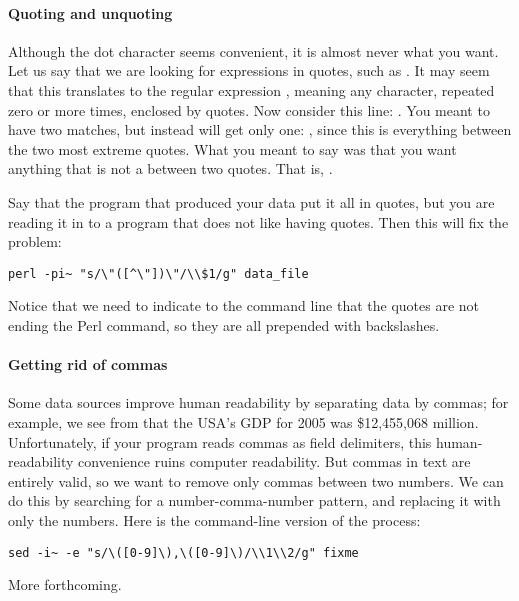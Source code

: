 \paragraph{Quoting and unquoting}
Although the dot character seems convenient, it is almost never what you
want. Let us say that we are looking for expressions in quotes,
such as . It may seem that this translates to the regular
expression , meaning any character, repeated zero or more
times, enclosed by quotes. Now consider this line: . You meant to have two matches, but instead will get only
one: , since this is everything between the
two most extreme quotes. What you meant to say was that you want anything
that is not a  between two quotes. That is, . 

Say that the program that produced your data put it all in
quotes, but you are reading it in to a  program that does not like
having quotes. Then this will fix the problem:
\begin{lstlisting}
perl -pi~ "s/\"([^\"])\"/\\$1/g" data_file
\end{lstlisting}
Notice that we need to indicate to the command line that the quotes are
not ending the Perl command, so they are all prepended with backslashes.

\paragraph{Getting rid of commas}
Some data sources improve human readability by separating data by
commas; for example, we see from  that the USA's GDP for
2005 was \$12,455,068 million. Unfortunately, if your program reads
commas as field delimiters, this human-readability convenience ruins
computer readability. But commas in text are entirely valid, so we want
to remove only commas between two numbers. We can do this by searching
for a number-comma-number pattern, and replacing it with only the
numbers. Here is the  command-line version of the process:
\begin{lstlisting}
sed -i~ -e "s/\([0-9]\),\([0-9]\)/\\1\\2/g" fixme
\end{lstlisting}


More forthcoming.


